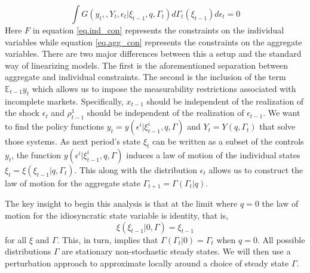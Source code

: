 \documentclass[thmsb,11pt]{article}
\newcommand{\EE}{\mathbb E}
\begin{document}
\begin{equation}\label{eq.agg_con}
	\int G(y_t,,Y_t,\epsilon_t|\xi_{t-1},q,\Gamma_t) d\Gamma_t(\xi_{t-1})d\epsilon_t = 0
\end{equation}  Here $F$ in equation \eqref{eq.ind_con} represents the constraints on the individual variables while equation \eqref{eq.agg_con} represents the constraints on the aggregate variables.  There are two major differences between this a setup and the standard way of linearizing models.  The first is the aforementioned separation between aggregate and individual constraints.   The second is the inclusion of the term  $\EE_{t-1} y_t$ which allows us to impose the measurability restrictions associated with incomplete markets.  Specifically, $x_{t-1}$ should be independent of the realization of the shock $\epsilon_t$ and $\rho^1_{t-1}$ should be independent of the realization of $\epsilon_{t-1}$.  We want to find the policy functions $y_t= y(\epsilon^i| \xi^i_{t-1},q,\Gamma)$ and  $Y_t = Y(q,\Gamma_t)$ that solve those systems.  As next period's state $\xi_t$ can be written as a subset of the controls $y_t$, the function $y(\epsilon^i| \xi^i_{t-1},q,\Gamma)$ induces a law of motion of the individual states $\xi_t = \xi(\xi_{t-1}|q,\Gamma_t)$.  This along with the distribution $\epsilon_t$ allows us to construct the law of motion for the aggregate state $\Gamma_{t+1} = \Gamma(\Gamma_t | q)$.

The key insight to begin this analysis is that at the limit where $q = 0$ the law of motion for the idiosyncratic state variable is identity, that is,
\[
	\xi(\xi_{t-1}|0,\Gamma) = \xi_{t-1}
\] for all $\xi$ and $\Gamma$.  This, in turn, implies that $\Gamma(\Gamma_{t}|0) = \Gamma_{t}$ when $q=0$.  All possible distributions $\Gamma$ are stationary non-stochastic steady states.   We will then use a perturbation approach to approximate locally around a choice of steady state $\Gamma$.
\end{document}
